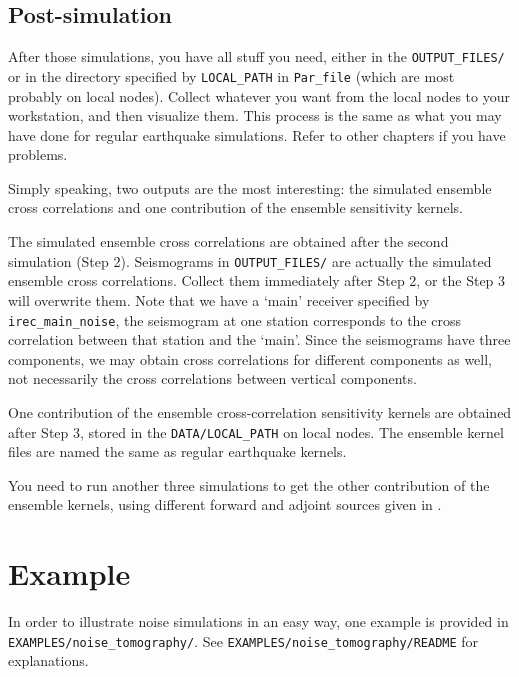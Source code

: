 \subsection{Post-simulation}

After those simulations, you have all stuff you need, either in the
\texttt{OUTPUT\_FILES/} or in the directory specified by \texttt{LOCAL\_PATH}
in \texttt{Par\_file} (which are most probably on local nodes).
Collect whatever you want from the local nodes to your workstation,
and then visualize them. This process is the same as what you may
have done for regular earthquake simulations. Refer to other chapters
if you have problems.\newline


Simply speaking, two outputs are the most interesting: the simulated
ensemble cross correlations and one contribution of the ensemble sensitivity
kernels.\newline


The simulated ensemble cross correlations are obtained after the second
simulation (Step 2). Seismograms in \texttt{OUTPUT\_FILES/} are actually
the simulated ensemble cross correlations. Collect them immediately
after Step 2, or the Step 3 will overwrite them. Note that we have
a `main' receiver specified by \texttt{irec\_main\_noise}, the
seismogram at one station corresponds to the cross correlation between
that station and the `main'. Since the seismograms have three components,
we may obtain cross correlations for different components as well,
not necessarily the cross correlations between vertical components.\newline


One contribution of the ensemble cross-correlation sensitivity kernels
are obtained after Step 3, stored in the \texttt{DATA/LOCAL\_PATH}
on local nodes. The ensemble kernel files are named the same as regular
earthquake kernels.\newline


You need to run another three simulations to get the other contribution
of the ensemble kernels, using different forward and adjoint sources
given in \citet{trompetal2010}.


\section{Example}

In order to illustrate noise simulations in an easy way, one example
is provided in \texttt{EXAMPLES/noise\_tomography/}. See \texttt{EXAMPLES/noise\_tomography/README}
for explanations. \newline


